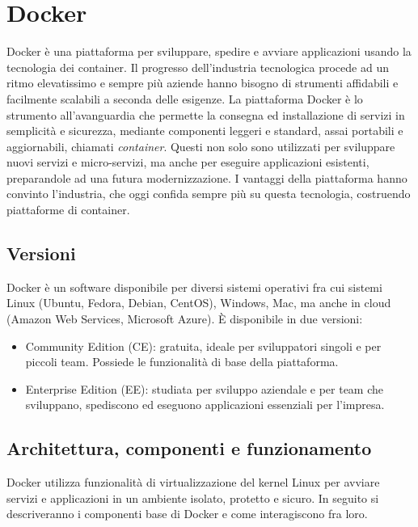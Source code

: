 \chapter{Docker}
\label{Docker}
\thispagestyle{plain}

Docker \cite{docker} è una piattaforma per sviluppare, spedire e avviare applicazioni usando la tecnologia dei container. Il progresso dell'industria tecnologica procede ad un ritmo elevatissimo e sempre più aziende hanno bisogno di strumenti affidabili e facilmente scalabili a seconda delle esigenze. La piattaforma Docker è lo strumento all'avanguardia che permette la consegna ed installazione di servizi in semplicità e sicurezza, mediante componenti leggeri e standard, assai portabili e aggiornabili, chiamati \emph{container}. Questi non solo sono utilizzati per sviluppare nuovi servizi e micro-servizi, ma anche per eseguire applicazioni esistenti, preparandole ad una futura modernizzazione. I vantaggi della piattaforma hanno convinto l'industria, che oggi confida sempre più su questa tecnologia, costruendo piattaforme di container.

\section{Versioni}
Docker è un software disponibile per diversi sistemi operativi fra cui sistemi Linux (Ubuntu, Fedora, Debian, CentOS), Windows, Mac, ma anche in cloud (Amazon Web Services, Microsoft Azure). È disponibile in due versioni:
\begin{itemize}
    \item Community Edition (CE): gratuita, ideale per sviluppatori singoli e per piccoli team. Possiede le funzionalità di base della piattaforma.
    \item Enterprise Edition (EE): studiata per sviluppo aziendale e per team che sviluppano, spediscono ed eseguono applicazioni essenziali per l'impresa.
\end{itemize}

\section{Architettura, componenti e funzionamento}
Docker \cite{docker_doc} utilizza funzionalità di virtualizzazione del kernel Linux per avviare servizi e applicazioni in un ambiente isolato, protetto e sicuro. In seguito si descriveranno i componenti base di Docker e come interagiscono fra loro.

